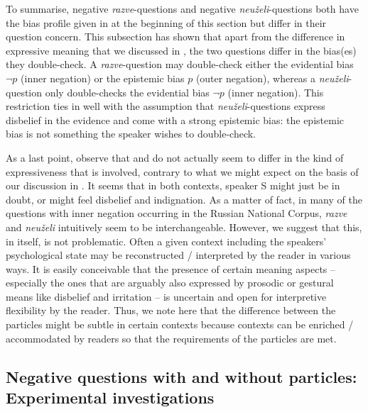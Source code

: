 \documentclass[output=paper,colorlinks,citecolor=brown]{langscibook}
\begin{document}
To summarise, negative \textit{razve}-questions and negative \textit{neuželi}-questions both have the bias profile given in  at the beginning of this section but differ in their question concern. This subsection has shown that apart from the difference in expressive meaning that we discussed in , the two questions differ in the bias(es) they double-check. A \textit{razve}-question may double-check either the evidential bias $\neg p$ (inner negation) or the epistemic bias $p$ (outer negation), whereas a \textit{neuželi}-question only double-checks the evidential bias $\neg p$ (inner negation). This restriction ties in well with the assumption that \textit{neuželi}-questions express disbelief in the evidence and come with a strong epistemic bias: the epistemic bias is not something the speaker wishes to double-check.

As a last point, observe that  and  do not actually seem to differ in the kind of expressiveness that is involved, contrary to what we might expect on the basis of our discussion in . It seems that in both contexts, speaker S might just be in doubt, or might feel disbelief and indignation. As a matter of fact, in many of the questions with inner negation occurring in the Russian National Corpus, \textit{razve} and \textit{neuželi} intuitively seem to be interchangeable. However, we suggest that this, in itself, is not problematic. Often a given context including the speakers' psychological state may be reconstructed / interpreted by the reader in various ways. It is easily conceivable that the presence of certain meaning aspects – especially the ones that are arguably also expressed by prosodic or gestural means like disbelief and irritation – is uncertain and open for interpretive flexibility by the reader. Thus, we note here that the difference between the particles might be subtle in certain contexts because contexts can be enriched / accommodated by readers so that the requirements of the particles are met.

\subsection{Negative questions with and without particles: Experimental investigations}\label{sec:05:3:3}
\end{document}
